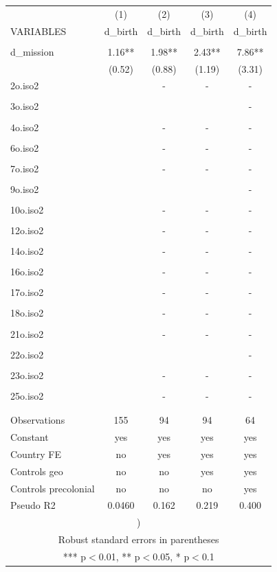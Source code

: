 \documentclass[]{article}
\begin{document}
\begin{tabular}{lcccc} \hline
 & (1) & (2) & (3) & (4) \\
VARIABLES & d\_birth & d\_birth & d\_birth & d\_birth \\ \hline
 &  &  &  &  \\
d\_mission & 1.16** & 1.98** & 2.43** & 7.86** \\
 & (0.52) & (0.88) & (1.19) & (3.31) \\
2o.iso2 &  & - & - & - \\
 &  &  &  &  \\
3o.iso2 &  &  &  & - \\
 &  &  &  &  \\
4o.iso2 &  & - & - & - \\
 &  &  &  &  \\
6o.iso2 &  & - & - & - \\
 &  &  &  &  \\
7o.iso2 &  & - & - & - \\
 &  &  &  &  \\
9o.iso2 &  &  &  & - \\
 &  &  &  &  \\
10o.iso2 &  & - & - & - \\
 &  &  &  &  \\
12o.iso2 &  & - & - & - \\
 &  &  &  &  \\
14o.iso2 &  & - & - & - \\
 &  &  &  &  \\
16o.iso2 &  & - & - & - \\
 &  &  &  &  \\
17o.iso2 &  & - & - & - \\
 &  &  &  &  \\
18o.iso2 &  & - & - & - \\
 &  &  &  &  \\
21o.iso2 &  & - & - & - \\
 &  &  &  &  \\
22o.iso2 &  &  &  & - \\
 &  &  &  &  \\
23o.iso2 &  & - & - & - \\
 &  &  &  &  \\
25o.iso2 &  & - & - & - \\
 &  &  &  &  \\
 &  &  &  &  \\
Observations & 155 & 94 & 94 & 64 \\
Constant & yes & yes & yes & yes \\
Country FE & no & yes & yes & yes \\
Controls geo & no & no & yes & yes \\
Controls precolonial & no & no & no & yes \\
 Pseudo R2 & 0.0460 & 0.162 & 0.219 & 0.400 \\ \hline
\multicolumn{5}{c}{ )} \\
\multicolumn{5}{c}{ Robust standard errors in parentheses} \\
\multicolumn{5}{c}{ *** p$<$0.01, ** p$<$0.05, * p$<$0.1} \\
\end{tabular}
\end{document}
